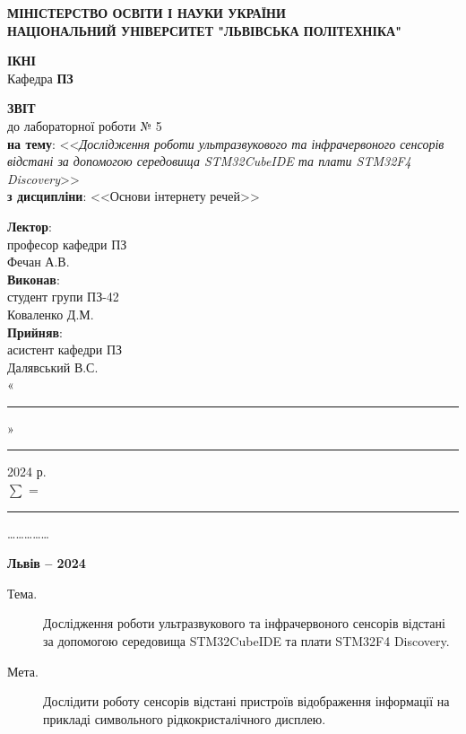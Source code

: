 \documentclass[oneside,14pt]{extarticle}
\newcommand\subject{Основи інтернету речей}
\newcommand\lecturer{професор кафедри ПЗ\\Фечан А.В.}
\newcommand\teacher{асистент кафедри ПЗ\\Далявський В.С.}
\newcommand\mygroup{ПЗ-42}
\newcommand\lab{5}
\newcommand\theme{Дослідження роботи ультразвукового та інфрачервоного сенсорів
	відстані за допомогою середовища STM32CubeIDE та плати STM32F4
	Discovery}
\newcommand\purpose{Дослідити роботу сенсорів відстані пристроїв
	відображення інформації на прикладі символьного рідкокристалічного
	дисплею}
\begin{document}
\begin{normalsize}
	\begin{titlepage}
		\thispagestyle{empty}
		\begin{center}
			\textbf{МІНІСТЕРСТВО ОСВІТИ І НАУКИ УКРАЇНИ\\
				НАЦІОНАЛЬНИЙ УНІВЕРСИТЕТ "ЛЬВІВСЬКА ПОЛІТЕХНІКА"}
		\end{center}
		\begin{flushright}
			\textbf{ІКНІ}\\
			Кафедра \textbf{ПЗ}
		\end{flushright}
		\vspace{80pt}
		\begin{center}
			\textbf{ЗВІТ}\\
			\vspace{10pt}
			до лабораторної роботи № \lab\\
			\textbf{на тему}: <<\textit{\theme}>>\\
			\textbf{з дисципліни}: <<\subject>>
		\end{center}
		\vspace{80pt}
		\begin{flushright}
			
			\textbf{Лектор}:\\
			\lecturer\\
			\vspace{28pt}
			\textbf{Виконав}:\\
			
			студент групи \mygroup\\
			Коваленко Д.М.\\
			\vspace{28pt}
			\textbf{Прийняв}:\\
			
			\teacher\\
			
			\vspace{28pt}
			«\rule{1cm}{0.15mm}» \rule{1.5cm}{0.15mm} 2024 р.\\
			$\sum$ = \rule{1cm}{0.15mm}……………\\
			
		\end{flushright}
		\vspace{\fill}
		\begin{center}
			\textbf{Львів – 2024}
		\end{center}
	\end{titlepage}
		
	\begin{description}
		\item[Тема.] \theme.
		\item[Мета.] \purpose.
	\end{description}


\end{normalsize}
\end{document}
